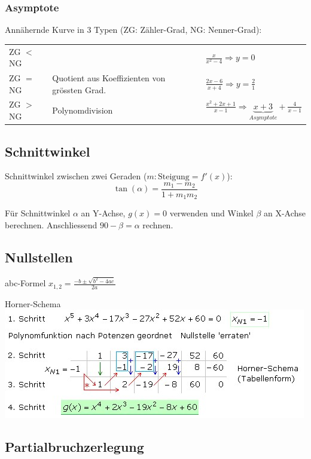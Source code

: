 \subsubsection{Asymptote }
Annähernde Kurve in 3 Typen (ZG: Zähler-Grad, NG: Nenner-Grad):\\
\begin{tabular}{p{1.5cm}p{3.1cm}p{4.2cm}}
	ZG $<$ NG & & $\frac{x}{x^2 - 4} \Rightarrow y = 0$ \\
	ZG $=$ NG & Quotient aus Koeffizienten von grössten Grad. & $\frac{2x-6}{x+4} \Rightarrow y = \frac{2}{1}$ \\
	ZG $>$ NG & Polynomdivision & $\frac{x^2 + 2x + 1}{x - 1} \Rightarrow \underbrace{x + 3}_{Asymptote} + \frac{4}{x -1}$
\end{tabular}

\subsection{Schnittwinkel}
Schnittwinkel zwischen zwei Geraden ($m: \text{Steigung} = f'(x)$):
\[ \tan(\alpha) = \frac{m_1 - m_2}{1 + m_1m_2} \]

\noindent Für Schnittwinkel $\alpha$ an Y-Achse, $g(x) = 0$ verwenden und Winkel $\beta$ an X-Achse berechnen. Anschliessend $90-\beta = \alpha$ rechnen.\\


\subsection{Nullstellen}
\noindent abc-Formel $x_{1,2} = \frac{-b\pm\sqrt{b^2-4ac}}{2a}$

\noindent Horner-Schema \\
\includegraphics[width=\columnwidth]{./Images/horner.jpg}


\subsection{Partialbruchzerlegung }

